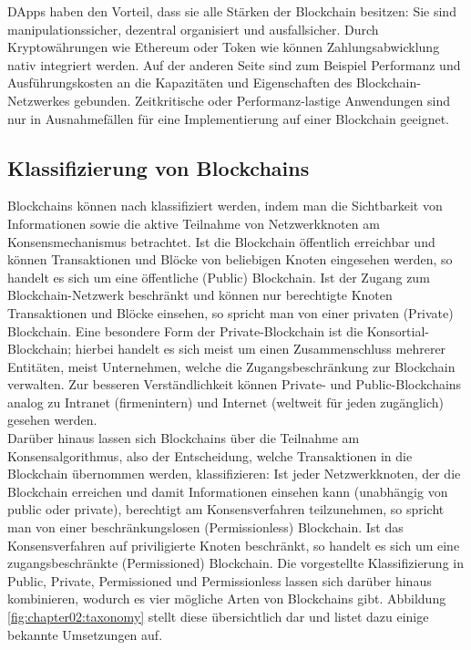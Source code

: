 \ac{DApp}s haben den Vorteil, dass sie alle Stärken der Blockchain besitzen: Sie sind manipulationssicher, dezentral organisiert und ausfallsicher. Durch Kryptowährungen wie Ethereum oder Token wie können Zahlungsabwicklung nativ integriert werden. Auf der anderen Seite sind zum Beispiel Performanz und Ausführungskosten an die Kapazitäten und Eigenschaften des Blockchain-Netzwerkes gebunden. Zeitkritische oder Performanz-lastige Anwendungen sind nur in Ausnahmefällen für eine Implementierung auf einer Blockchain geeignet.

\subsection{Klassifizierung von Blockchains}
\label{subsec:fundamentals:dlt:classification}
Blockchains können nach \cite{overview2017} klassifiziert werden, indem man die Sichtbarkeit von Informationen sowie die aktive Teilnahme von Netzwerkknoten am Konsensmechanismus betrachtet. Ist die Blockchain öffentlich erreichbar und können Transaktionen und Blöcke von beliebigen Knoten eingesehen werden, so handelt es sich um eine öffentliche (Public) Blockchain. Ist der Zugang zum Blockchain-Netzwerk beschränkt und können nur berechtigte Knoten Transaktionen und Blöcke einsehen, so spricht man von einer privaten (Private) Blockchain. Eine besondere Form der Private-Blockchain ist die Konsortial-Blockchain; hierbei handelt es sich meist um einen Zusammenschluss mehrerer Entitäten, meist Unternehmen, welche die Zugangsbeschränkung zur Blockchain verwalten. Zur besseren Verständlichkeit können Private- und Public-Blockchains analog zu Intranet (firmenintern) und Internet (weltweit für jeden zugänglich) gesehen werden.\\
Darüber hinaus lassen sich Blockchains über die Teilnahme am Konsensalgorithmus, also der Entscheidung, welche Transaktionen in die Blockchain übernommen werden, klassifizieren: Ist jeder Netzwerkknoten, der die Blockchain erreichen und damit Informationen einsehen kann (unabhängig von public oder private), berechtigt am Konsensverfahren teilzunehmen, so spricht man von einer beschränkungslosen (Permissionless) Blockchain. Ist das Konsensverfahren auf priviligierte Knoten beschränkt, so handelt es sich um eine zugangsbeschränkte (Permissioned) Blockchain. Die vorgestellte Klassifizierung in Public, Private, Permissioned und Permissionless lassen sich darüber hinaus kombinieren, wodurch es vier mögliche Arten von Blockchains gibt. Abbildung \ref{fig:chapter02:taxonomy} stellt diese übersichtlich dar und listet dazu einige bekannte Umsetzungen auf.

